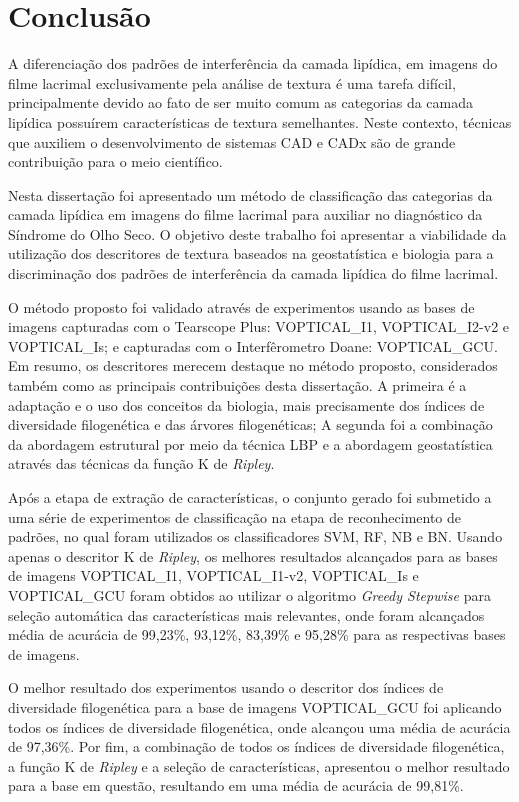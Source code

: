 \chapter{Conclusão}
\phantom{2}

A diferenciação dos padrões de interferência da camada lipídica, em imagens do filme lacrimal exclusivamente pela análise de textura é uma tarefa difícil, principalmente devido ao fato de ser muito comum as categorias da camada lipídica possuírem características de textura semelhantes. Neste contexto, técnicas que auxiliem o desenvolvimento de sistemas CAD e CADx são de grande contribuição para o meio científico.

Nesta dissertação foi apresentado um método de classificação das categorias da camada lipídica em imagens do filme lacrimal para auxiliar no diagnóstico da Síndrome do Olho Seco. O objetivo deste trabalho foi apresentar a viabilidade da utilização dos descritores de textura baseados na geostatística e biologia para a discriminação dos padrões de interferência da camada lipídica do filme lacrimal.

O método proposto foi validado através de experimentos usando as bases de imagens capturadas com o Tearscope Plus: VOPTICAL\_I1, VOPTICAL\_I2-v2 e VOPTICAL\_Is; e capturadas com o Interfêrometro Doane: VOPTICAL\_GCU. Em resumo, os descritores merecem destaque no método proposto, considerados também como as principais contribuições desta dissertação. A primeira é a adaptação e o uso dos conceitos da biologia, mais precisamente dos índices de diversidade filogenética e das árvores filogenéticas; A segunda foi a combinação da abordagem estrutural por meio da técnica LBP e a abordagem geostatística através das técnicas da função K de \textit{Ripley}.

Após a etapa de extração de características, o conjunto gerado foi submetido a uma série de experimentos de classificação na etapa de reconhecimento de padrões, no qual foram utilizados os classificadores SVM, RF, NB e BN. Usando apenas o descritor K de \textit{Ripley}, os melhores resultados alcançados para as bases de imagens VOPTICAL\_I1, VOPTICAL\_I1-v2, VOPTICAL\_Is e VOPTICAL\_GCU foram obtidos ao utilizar o algoritmo \textit{Greedy Stepwise} para seleção automática das características mais relevantes, onde foram alcançados média de acurácia de 99,23\%, 93,12\%, 83,39\% e 95,28\% para as respectivas bases de imagens.

O melhor resultado dos experimentos usando o descritor dos índices de diversidade filogenética para a base de imagens VOPTICAL\_GCU foi aplicando todos os índices de diversidade filogenética, onde alcançou uma média de acurácia de 97,36\%. Por fim, a combinação de todos os índices de diversidade filogenética, a função K de \textit{Ripley} e a seleção de características, apresentou o melhor resultado para a base em questão, resultando em uma média de acurácia de 99,81\%.

